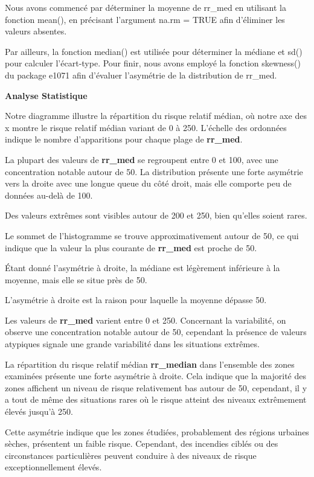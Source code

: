 \documentclass[
]{article}
\begin{document}
Nous avons commencé par déterminer la moyenne de rr\_med en utilisant la
fonction mean(), en précisant l'argument na.rm = TRUE afin d'éliminer
les valeurs absentes.

Par ailleurs, la fonction median() est utilisée pour déterminer la
médiane et sd() pour calculer l'écart-type. Pour finir, nous avons
employé la fonction skewness() du package e1071 afin d'évaluer
l'asymétrie de la distribution de rr\_med.

\textbf{Analyse Statistique}

Notre diagramme illustre la répartition du risque relatif médian, où
notre axe des x montre le risque relatif médian variant de 0 à 250.
L'échelle des ordonnées indique le nombre d'apparitions pour chaque
plage de \textbf{rr\_med}.

La plupart des valeurs de \textbf{rr\_med} se regroupent entre 0 et 100,
avec une concentration notable autour de 50. La distribution présente
une forte asymétrie vers la droite avec une longue queue du côté droit,
mais elle comporte peu de données au-delà de 100.

Des valeurs extrêmes sont visibles autour de 200 et 250, bien qu'elles
soient rares.

Le sommet de l'histogramme se trouve approximativement autour de 50, ce
qui indique que la valeur la plus courante de \textbf{rr\_med} est
proche de 50.

Étant donné l'asymétrie à droite, la médiane est légèrement inférieure à
la moyenne, mais elle se situe près de 50.

L'asymétrie à droite est la raison pour laquelle la moyenne dépasse 50.

Les valeurs de \textbf{rr\_med} varient entre 0 et 250. Concernant la
variabilité, on observe une concentration notable autour de 50,
cependant la présence de valeurs atypiques signale une grande
variabilité dans les situations extrêmes.

La répartition du risque relatif médian \textbf{rr\_median} dans
l'ensemble des zones examinées présente une forte asymétrie à droite.
Cela indique que la majorité des zones affichent un niveau de risque
relativement bas autour de 50, cependant, il y a tout de même des
situations rares où le risque atteint des niveaux extrêmement élevés
jusqu'à 250.

Cette asymétrie indique que les zones étudiées, probablement des régions
urbaines sèches, présentent un faible risque. Cependant, des incendies
ciblés ou des circonstances particulières peuvent conduire à des niveaux
de risque exceptionnellement élevés.
\end{document}
